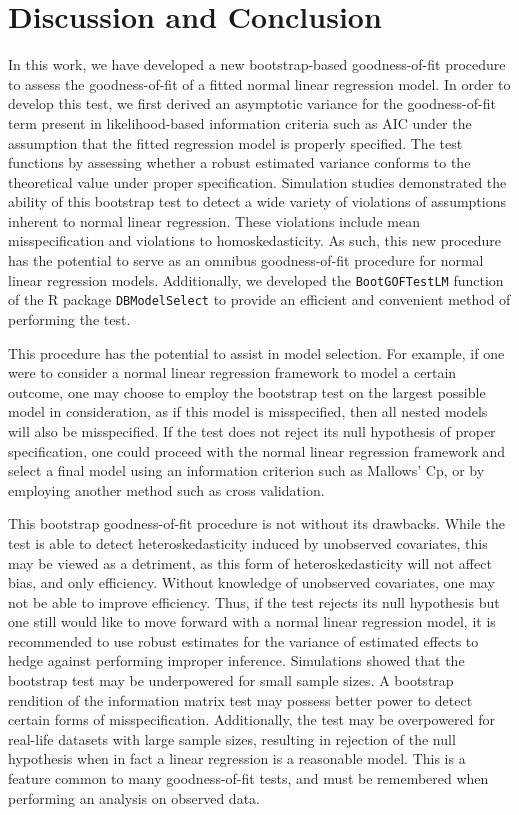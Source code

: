 \documentclass[sn-mathphys-ay]{sn-jnl}
\begin{document}
\section{Discussion and Conclusion}

In this work, we have developed a new bootstrap-based goodness-of-fit procedure to assess the goodness-of-fit of a fitted normal linear regression model. In order
to develop this test, we first derived an asymptotic variance for the goodness-of-fit term present in likelihood-based information criteria such as AIC under the assumption
that the fitted regression model is properly specified. The test functions by assessing whether a robust estimated variance conforms to the
theoretical value under proper specification. Simulation studies demonstrated the ability of this bootstrap test to detect a wide variety of violations of assumptions inherent to
normal linear regression. These violations include mean misspecification and violations to homoskedasticity. As such, this new procedure has the potential to serve as an omnibus
goodness-of-fit procedure for normal linear regression models. Additionally, we developed the \texttt{BootGOFTestLM} function of the R package \texttt{DBModelSelect} to provide
an efficient and convenient method of performing the test.

This procedure has the potential to assist in model selection. For example, if one were to consider a normal linear regression framework to model a certain outcome, one may
choose to employ the bootstrap test on the largest possible model in consideration, as if this model is misspecified, then all nested models will also be misspecified.
If the test does not reject its null hypothesis of proper specification, one could proceed with the normal linear regression framework and select a final model using
an information criterion such as Mallows' Cp, or by employing another method such as cross validation.

This bootstrap goodness-of-fit procedure is not without its drawbacks. While the test is able to detect heteroskedasticity induced by unobserved covariates, this may be viewed as a detriment,
as this form of heteroskedasticity will not affect bias, and only efficiency. Without knowledge of unobserved covariates, one may not be able to improve efficiency. Thus, if the test rejects its
null hypothesis but one still would like  to move forward with a normal linear regression model, it is recommended to use robust estimates for the variance of estimated effects
to hedge against performing improper inference. Simulations showed that the bootstrap test may be underpowered for small sample sizes. A bootstrap rendition of the information matrix test may
possess better power to detect certain forms of misspecification. Additionally, the test may be overpowered for real-life datasets with large sample sizes, resulting in rejection of the null hypothesis
when in fact a linear regression is a reasonable model. This is a feature common to many goodness-of-fit tests, and must be remembered when performing an analysis on observed data.
\end{document}
